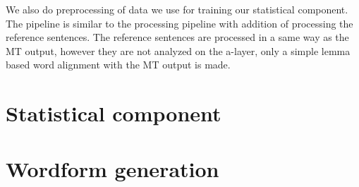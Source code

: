 We also do preprocessing of data we use for training our statistical component.
The pipeline is similar to the processing pipeline with addition of processing
the reference sentences. The reference sentences are processed in a same way
as the MT output, however they are not analyzed on the a-layer, only a simple
lemma based word alignment with the MT output is made.

\section{Statistical component}



\section{Wordform generation}
